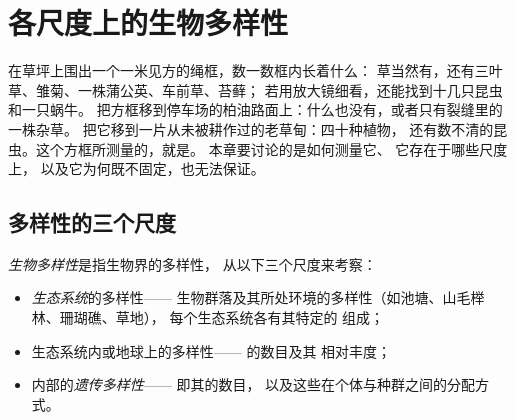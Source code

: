 \chapter{各尺度上的生物多样性}\label{ch:g10:biodiversity-scales}

在草坪上围出一个一米见方的绳框，数一数框内长着什么：
草当然有，还有三叶草、雏菊、一株蒲公英、车前草、苔藓；
若用放大镜细看，还能找到十几只昆虫和一只蜗牛。
把方框移到停车场的柏油路面上：什么也没有，或者只有裂缝里的一株杂草。
把它移到一片从未被耕作过的老草甸：四十种植物，
还有数不清的昆虫。这个方框所测量的，就是\emph{}。
本章要讨论的是如何测量它、
它存在于哪些尺度上，
以及它为何既不固定，也无法保证。

\section{多样性的三个尺度}

\begin{definition}[生物多样性]\label{def:g10:biodiversity-scales:biodiversity}
\emph{生物多样性}是指生物界的多样性，
从以下三个尺度来考察：
\begin{itemize}
  \item \emph{生态系统}的多样性——
        生物群落及其所处环境的多样性（如池塘、山毛榉林、珊瑚礁、草地），
        每个生态系统各有其特定的
        组成；
  \item 生态系统内或地球上的多样性——
        的数目及其
        相对丰度；
  \item {}内部的\emph{遗传多样性}——
        即其的数目，
        以及这些在个体与种群之间的分配方式。
\end{itemize}
\end{definition}

